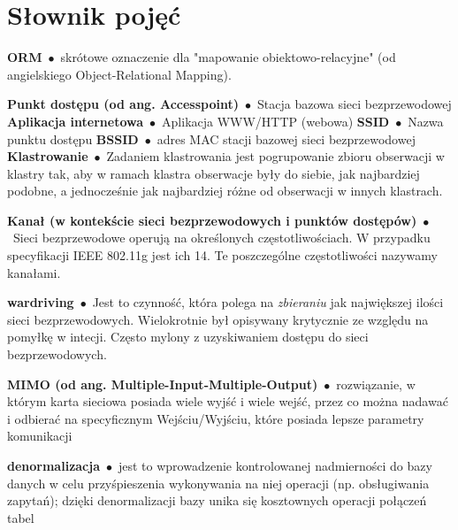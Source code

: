 \chapter*{Słownik pojęć}

\newcommand{\entry}[2]{\textbf{#1}\ $\bullet$\ {#2}}

\entry{ORM}{skrótowe oznaczenie dla "mapowanie obiektowo-relacyjne" (od angielskiego Object-Relational Mapping).}

\entry{Punkt dostępu (od ang. Accesspoint)}{Stacja bazowa sieci bezprzewodowej}
\entry{Aplikacja internetowa}{Aplikacja WWW/HTTP (webowa)}
\entry{SSID}{Nazwa punktu dostępu}
\entry{BSSID}{adres MAC stacji bazowej sieci bezprzewodowej}
\entry{Klastrowanie}{Zadaniem klastrowania jest pogrupowanie zbioru obserwacji w klastry tak, aby w ramach klastra obserwacje były do siebie, jak najbardziej podobne, a jednocześnie jak najbardziej różne od obserwacji w innych klastrach.}

\entry{Kanał (w kontekście sieci bezprzewodowych i punktów dostępów)}{Sieci bezprzewodowe operują na określonych częstotliwościach. W przypadku specyfikacji IEEE 802.11g jest ich 14. Te poszczególne częstotliwości nazywamy kanałami.}

\entry{wardriving}{Jest to czynność, która polega na \textit{zbieraniu} jak największej ilości sieci bezprzewodowych. Wielokrotnie był opisywany krytycznie ze względu na pomyłkę w intecji. Często mylony z uzyskiwaniem dostępu do sieci bezprzewodowych.\cite{WardrivingWiki}}

\entry{MIMO (od ang. Multiple-Input-Multiple-Output)}{rozwiązanie, w którym karta sieciowa posiada wiele wyjść i wiele wejść, przez co można nadawać i odbierać na specyficznym Wejściu/Wyjściu, które posiada lepsze parametry komunikacji}

\entry{denormalizacja}{jest to wprowadzenie kontrolowanej nadmierności do bazy danych w celu przyśpieszenia wykonywania na niej operacji (np. obsługiwania zapytań); dzięki denormalizacji bazy unika się kosztownych operacji połączeń tabel\cite{DenormalizacjaWiki}}
